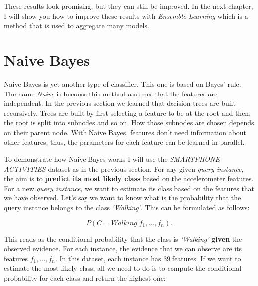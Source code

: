 \documentclass[
  11pt,
]{krantz}
\newenvironment{Shaded}{\begin{snugshade}}{\end{snugshade}}
\newcommand{\CommentTok}[1]{\textcolor[rgb]{0.37,0.37,0.37}{\textit{#1}}}
\newcommand{\FunctionTok}[1]{\textcolor[rgb]{0,0,0}{#1}}
\newcommand{\NormalTok}[1]{#1}
\newcommand{\SpecialCharTok}[1]{\textcolor[rgb]{0,0,0}{#1}}
\begin{document}
\begin{Shaded}
\end{Shaded}

These results look promising, but they can still be improved. In the next chapter, I will show you how to improve these results with \emph{Ensemble Learning} which is a method that is used to aggregate many models.

\hypertarget{naive-bayes}{%
\section{Naive Bayes}\label{naive-bayes}}

Naive Bayes is yet another type of classifier. This one is based on Bayes' rule. The name \emph{Naive} is because this method assumes that the features are independent. In the previous section we learned that decision trees are built recursively. Trees are built by first selecting a feature to be at the root and then, the root is split into subnodes and so on. How those subnodes are chosen depends on their parent node. With Naive Bayes, features don't need information about other features, thus, the parameters for each feature can be learned in parallel.

To demonstrate how Naive Bayes works I will use the \emph{SMARTPHONE ACTIVITIES} dataset as in the previous section. For any given \emph{query instance}, the aim is to \textbf{predict its most likely class} based on the accelerometer features. For a new \emph{query instance}, we want to estimate its class based on the features that we have observed. Let's say we want to know what is the probability that the query instance belongs to the class \emph{`Walking'}. This can be formulated as follows:

\begin{equation*}
  P(C=\textit{Walking} | f_1,\dots ,f_n).
\end{equation*}

This reads as the conditional probability that the class is \emph{`Walking'} \textbf{given} the observed evidence. For each instance, the evidence that we can observe are its features \(f_1, \dots ,f_n\). In this dataset, each instance has \(39\) features. If we want to estimate the most likely class, all we need to do is to compute the conditional probability for each class and return the highest one:
\end{document}

